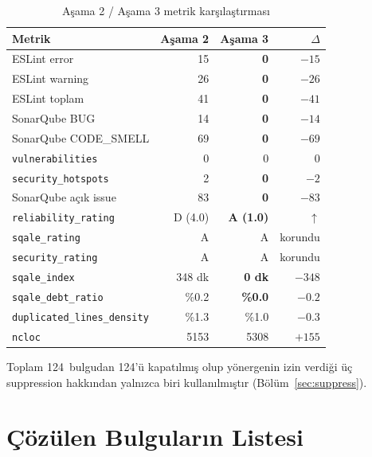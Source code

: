 \documentclass[conference]{IEEEtran}
\begin{document}
\begin{table}[htbp]
\caption{Aşama 2 / Aşama 3 metrik karşılaştırması}
\label{tab:summary}
\centering
\begin{tabular}{@{}lrrr@{}}
\toprule
\textbf{Metrik} & \textbf{Aşama 2} & \textbf{Aşama 3} & \textbf{$\Delta$} \\
\midrule
ESLint error                      &   15 &   \textbf{0} & $-15$ \\
ESLint warning                    &   26 &   \textbf{0} & $-26$ \\
ESLint toplam                     &   41 &   \textbf{0} & $-41$ \\
SonarQube BUG                     &   14 &   \textbf{0} & $-14$ \\
SonarQube CODE\_SMELL             &   69 &   \textbf{0} & $-69$ \\
\texttt{vulnerabilities}          &    0 &   0 & 0 \\
\texttt{security\_hotspots}       &    2 &   \textbf{0} & $-2$ \\
SonarQube açık issue              &   83 &   \textbf{0} & $-83$ \\
\texttt{reliability\_rating}      & D (4.0) & \textbf{A (1.0)} & $\uparrow$ \\
\texttt{sqale\_rating}            & A & A & korundu \\
\texttt{security\_rating}         & A & A & korundu \\
\texttt{sqale\_index}             & 348 dk & \textbf{0 dk} & $-348$ \\
\texttt{sqale\_debt\_ratio}       & \%0.2 & \textbf{\%0.0} & $-0.2$ \\
\texttt{duplicated\_lines\_density} & \%1.3 & \%1.0 & $-0.3$ \\
\texttt{ncloc}                    & 5153 & 5308 & $+155$ \\
\bottomrule
\end{tabular}
\end{table}

Toplam 124~bulgudan 124'ü kapatılmış olup yönergenin izin verdiği üç
suppression hakkından yalnızca biri kullanılmıştır
(Bölüm~\ref{sec:suppress}).

\section{Çözülen Bulguların Listesi}
\label{sec:cozumler}
\end{document}
